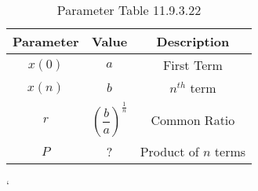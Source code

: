 
\begin{table}[ht]
  \centering
  \begin{tabular}{|c||c||c|}
    \hline
      \textbf{Parameter} & \textbf{Value} & \textbf{Description } \\
    \hline
       $x(0)$ & $a$ & First Term\\
     \hline
     $x(n)$ & $b$ & $n^{th}$ term\\
    \hline
      $r$ & $\left(\dfrac{b}{a}\right)^{\frac{1}{n}}$& Common Ratio \\
    \hline
     $P$ & ? & Product of $n$ terms\\
     \hline
  \end{tabular}
  \caption{Parameter Table 11.9.3.22}
\end{table}`
